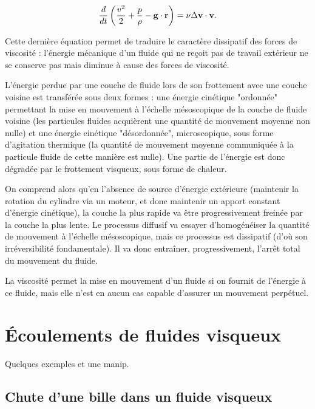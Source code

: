 \documentclass[11pt,a4paper]{report}
\begin{document}
\begin{equation}
	\frac{d}{dt}\left(\frac{v^2}{2} + \frac{p}{\rho} - \bold{g}\cdot\bold{r}\right) =  \nu\Delta\bold{v}\cdot \bold{v}.
\end{equation}

Cette dernière équation permet de traduire le caractère dissipatif des forces de viscosité : l'énergie mécanique d'un fluide qui ne reçoit pas de travail extérieur ne se conserve pas mais diminue à cause des forces de viscosité.

L'énergie perdue par une couche de fluide lors de son frottement avec une couche voisine est transférée sous deux formes : une énergie cinétique "ordonnée" permettant la mise en mouvement à l'échelle mésoscopique de la couche de fluide voisine (les particules fluides acquièrent une quantité de mouvement moyenne non nulle) et une énergie cinétique "désordonnée", microscopique, sous forme d'agitation thermique (la quantité de mouvement moyenne communiquée à la particule fluide de cette manière est nulle). Une partie de l'énergie est donc dégradée par le frottement visqueux, sous forme de chaleur.

On comprend alors qu'en l'absence de source d'énergie extérieure (maintenir la rotation du cylindre via un moteur, et donc maintenir un apport constant d'énergie cinétique), la couche la plus rapide va être progressivement freinée par la couche la plus lente. Le processus diffusif va essayer d'homogénéiser la quantité de mouvement à l'échelle mésoscopique, mais ce processus est dissipatif (d'où son irréversibilité fondamentale). Il va donc entraîner, progressivement, l'arrêt total du mouvement du fluide.

La viscosité permet la mise en mouvement d'un fluide si on fournit de l'énergie à ce fluide, mais elle n'est en aucun cas capable d'assurer un mouvement perpétuel.


\newpage
\section{Écoulements de fluides visqueux}\label{sec:3}

Quelques exemples et une manip.

\subsection{Chute d'une bille dans un fluide visqueux}\label{sec:3.1}
\end{document}
